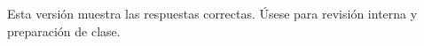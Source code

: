 \documentclass[11pt,addpoints]{exam}
\begin{document}

\begin{examwarn}
Esta versión muestra las respuestas correctas. Úsese para revisión interna y preparación de clase.
\end{examwarn}

\begin{questions}

\end{questions}
\end{document}
